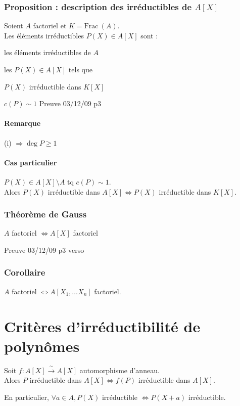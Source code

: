 \documentclass[reqno,a4paper,10pt]{report}
\makeatletter
\newcommand{\Frac}{\mathrm{Frac}\:} %
\newcommand{\so}{\Rightarrow}
\newcommand{\bij}{\overset{\!\sim}{\to}} %
\let\oldenumerate=\enumerate%
\renewenvironment{enumerate}{%
    \oldenumerate%
  }{%
    \@noparlisttrue%
    \endlist%
  }%
\makeatother
\begin{document}
\subsubsection{Proposition : description des irréductibles de $A[X]$}
Soient $A$ factoriel et $K=\Frac(A)$.\\
Les éléments irréductibles $P(X) \in A[X]$ sont :
\begin{enumerate}
  \item les éléments irréductibles de $A$
  \item les $P(X)\in A[X]$ tels que
    \begin{enumerate}
      \item $P(X)$ irréductible dans $K[X]$
      \item $c(P)\sim 1$
    \end{enumerate}
\end{enumerate}
  Preuve 03/12/09 p3

\paragraph{Remarque} (i) $\so \deg P \geq 1$
\paragraph{Cas particulier} $P(X) \in A[X]\setminus A$ tq $c(P) \sim 1$.\\
Alors $P(X)$ irréductible dans $A[X] \iff P(X)$ irréductible dans $K[X]$.

\subsubsection{Théorème de Gauss}
$A$ factoriel $\iff A[X]$ factoriel

  Preuve 03/12/09 p3 verso

\subsubsection{Corollaire}
$A$ factoriel $\iff A[X_1,\dots X_n]$ factoriel.

\section{Critères d'irréductibilité de polynômes}
Soit $f:A[X] \bij A[X]$ automorphisme d'anneau.\\
Alors $P$ irréductible dans $A[X] \iff f(P)$ irréductible dans $A[X]$.

En particulier, $\forall a \in A, P(X)$ irréductible $\iff P(X+a)$
irréductible.
\end{document}
